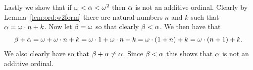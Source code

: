 {{    Lastly we show that if $\omega < \alpha < \omega^2$ then $\alpha$ is not an additive ordinal.
    Clearly by Lemma~\ref{lem:ord:w2form} there are natural numbers $n$ and $k$ such that $\alpha = \omega \cdot n + k$.
    Now let $\beta = \omega$ so that clearly $\beta < \alpha$.
    We then have that
    $$
      \beta + \alpha = \omega + \omega \cdot n + k = \omega \cdot 1 + \omega \cdot n + k = \omega \cdot (1 + n) + k = \omega \cdot (n+1) + k.
    $$
    We also clearly have
    so that $\beta + \alpha \neq \alpha$.
    Since $\beta < \alpha$ this shows that $\alpha$ is not an additive ordinal.
  }
}

